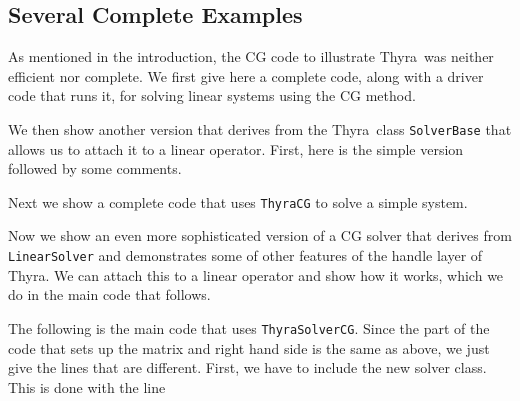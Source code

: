 \documentclass[12pt]{article}
\newcommand{\thyra}{{\sf Thyra}}
\newcommand{\teuchos}{{\sf Teuchos}}
\newcommand{\lcode}[1]{{\tt #1}}
\begin{document}

\subsection{Several Complete Examples}\label{examp}

As mentioned in the introduction, the CG code to illustrate \thyra\
was neither efficient nor complete.  We first give here a complete
code, along with a driver code that runs it, for solving linear
systems using the CG method.


We then show another version that derives from the \thyra\ class
\lcode{SolverBase} that allows us to attach it to a linear operator.
First, here is the simple version followed by some comments.



 

%

Next we show a complete code that uses \lcode{ThyraCG} to solve a
simple system.  

Now we show an even more sophisticated version of a CG solver that
derives from \lcode{LinearSolver} and demonstrates  some of other
features of the handle layer of \thyra. We can attach this to a linear
operator and show how it 
works, which we do in the main code that follows. 





The following is the main code that uses \lcode{ThyraSolverCG}.  Since
the part of the code that sets up the matrix and right hand side is
the same as above, we just give the lines that are different.  First, we have
to include the new solver class.  This is done with the line
\end{document}
